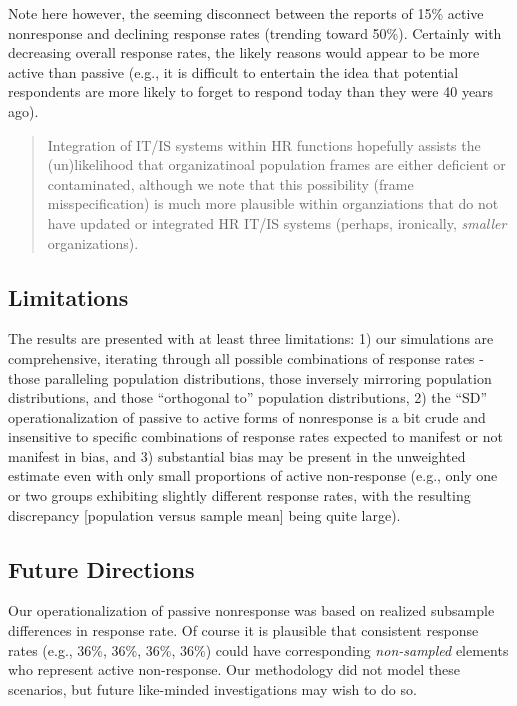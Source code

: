 \documentclass[
  man,mask]{apa7}
\begin{document}
Note here however, the seeming disconnect between the reports of 15\% active nonresponse and declining response rates (trending toward 50\%). Certainly with decreasing overall response rates, the likely reasons would appear to be more active than passive (e.g., it is difficult to entertain the idea that potential respondents are more likely to forget to respond today than they were 40 years ago).

\begin{quote}
Integration of IT/IS systems within HR functions hopefully assists the (un)likelihood that organizatinoal population frames are either deficient or contaminated, although we note that this possibility (frame misspecification) is much more plausible within organziations that do not have updated or integrated HR IT/IS systems (perhaps, ironically, \emph{smaller} organizations).
\end{quote}

\subsection{Limitations}\label{limitations}

The results are presented with at least three limitations: 1) our simulations are comprehensive, iterating through all possible combinations of response rates - those paralleling population distributions, those inversely mirroring population distributions, and those ``orthogonal to'' population distributions, 2) the ``SD'' operationalization of passive to active forms of nonresponse is a bit crude and insensitive to specific combinations of response rates expected to manifest or not manifest in bias, and 3) substantial bias may be present in the unweighted estimate even with only small proportions of active non-response (e.g., only one or two groups exhibiting slightly different response rates, with the resulting discrepancy {[}population versus sample mean{]} being quite large).

\subsection{Future Directions}\label{future-directions}

Our operationalization of passive nonresponse was based on realized subsample differences in response rate. Of course it is plausible that consistent response rates (e.g., 36\%, 36\%, 36\%, 36\%) could have corresponding \emph{non-sampled} elements who represent active non-response. Our methodology did not model these scenarios, but future like-minded investigations may wish to do so.
\end{document}
